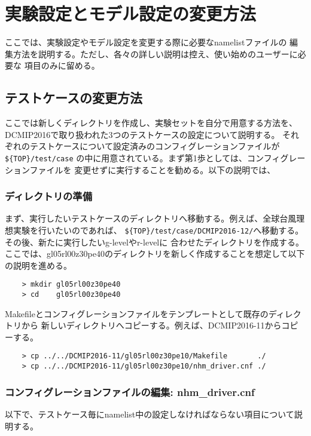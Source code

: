 \section{実験設定とモデル設定の変更方法}
ここでは、実験設定やモデル設定を変更する際に必要なnamelistファイルの
編集方法を説明する。ただし、各々の詳しい説明は控え、使い始めのユーザーに必要な
項目のみに留める。

\subsection{テストケースの変更方法}

 \noindent ここでは新しくディレクトリを作成し、実験セットを自分で用意する方法を、
DCMIP2016で取り扱われた3つのテストケースの設定について説明する。
それぞれのテストケースについて設定済みのコンフィグレーションファイルが\verb|${TOP}/test/case|
の中に用意されている。まず第1歩としては、コンフィグレーションファイルを
変更せずに実行することを勧める。以下の説明では、

\subsubsection{ディレクトリの準備}
まず、実行したいテストケースのディレクトリへ移動する。例えば、全球台風理想実験を行いたいのであれば、
\verb|${TOP}/test/case/DCMIP2016-12/|へ移動する。その後、新たに実行したいg-levelやr-levelに
合わせたディレクトリを作成する。
ここでは、gl05rl00z30pe40のディレクトリを新しく作成することを想定して以下の説明を進める。
 \begin{verbatim}
    > mkdir gl05rl00z30pe40
    > cd    gl05rl00z30pe40
 \end{verbatim}

 \noindent Makefileとコンフィグレーションファイルをテンプレートとして既存のディレクトリから
新しいディレクトリへコピーする。例えば、DCMIP2016-11からコピーする。
 \begin{verbatim}
    > cp ../../DCMIP2016-11/gl05rl00z30pe10/Makefile       ./
    > cp ../../DCMIP2016-11/gl05rl00z30pe10/nhm_driver.cnf ./
 \end{verbatim}

\subsubsection{コンフィグレーションファイルの編集: nhm\_driver.cnf}
以下で、テストケース毎にnamelist中の設定しなければならない項目について説明する。

